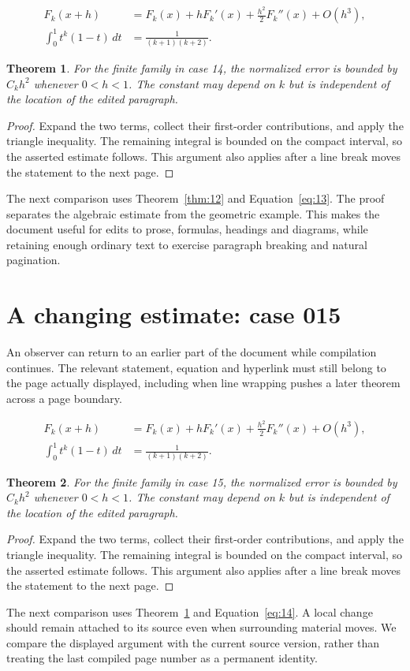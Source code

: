 \documentclass[a4paper,10pt]{article}
\newtheorem{theorem}{Theorem}[section]
\begin{document}
\lipsum[10-11]
\begin{align}\label{eq:13}
 F_k(x+h)&=F_k(x)+hF_k'(x)+\frac{h^2}{2}F_k''(x)+O(h^3),\\
 \int_0^1 t^k(1-t)\,dt&=\frac{1}{(k+1)(k+2)}.
\end{align}
\begin{theorem}\label{thm:13}
For the finite family in case 14, the normalized error is bounded by $C_k h^2$ whenever $0<h<1$. The constant may depend on $k$ but is independent of the location of the edited paragraph.
\end{theorem}
\begin{proof}
Expand the two terms, collect their first-order contributions, and apply the
triangle inequality. The remaining integral is bounded on the compact interval,
so the asserted estimate follows. This argument also applies after a line break
moves the statement to the next page.
\end{proof}
The next comparison uses Theorem~\ref{thm:12} and Equation~\ref{eq:13}. The proof separates the algebraic estimate from the geometric example. This makes the document useful for edits to prose, formulas, headings and diagrams, while retaining enough ordinary text to exercise paragraph breaking and natural pagination.

\lipsum[18]

\section{A changing estimate: case 015}\label{unit:14}
An observer can return to an earlier part of the document while compilation continues. The relevant statement, equation and hyperlink must still belong to the page actually displayed, including when line wrapping pushes a later theorem across a page boundary.

\lipsum[13-14]
\begin{align}\label{eq:14}
 F_k(x+h)&=F_k(x)+hF_k'(x)+\frac{h^2}{2}F_k''(x)+O(h^3),\\
 \int_0^1 t^k(1-t)\,dt&=\frac{1}{(k+1)(k+2)}.
\end{align}
\begin{theorem}\label{thm:14}
For the finite family in case 15, the normalized error is bounded by $C_k h^2$ whenever $0<h<1$. The constant may depend on $k$ but is independent of the location of the edited paragraph.
\end{theorem}
\begin{proof}
Expand the two terms, collect their first-order contributions, and apply the
triangle inequality. The remaining integral is bounded on the compact interval,
so the asserted estimate follows. This argument also applies after a line break
moves the statement to the next page.
\end{proof}
The next comparison uses Theorem~\ref{thm:13} and Equation~\ref{eq:14}. A local change should remain attached to its source even when surrounding material moves. We compare the displayed argument with the current source version, rather than treating the last compiled page number as a permanent identity.
\end{document}
